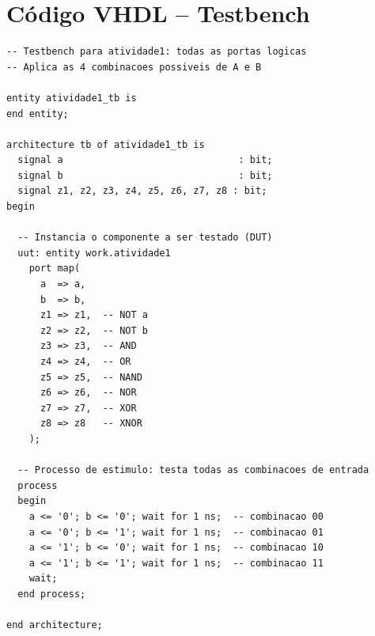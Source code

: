 \documentclass[12pt,a4paper, brazil]{article}
\begin{document}
\newpage

\section{Código VHDL -- Testbench}
\label{ap:testbench}

\begin{lstlisting}[style=vhdl, caption={Arquivo atividade1\_tb.vhd -- testbench para simulação.}]
-- Testbench para atividade1: todas as portas logicas
-- Aplica as 4 combinacoes possiveis de A e B

entity atividade1_tb is
end entity;

architecture tb of atividade1_tb is
  signal a                               : bit;
  signal b                               : bit;
  signal z1, z2, z3, z4, z5, z6, z7, z8 : bit;
begin

  -- Instancia o componente a ser testado (DUT)
  uut: entity work.atividade1
    port map(
      a  => a,
      b  => b,
      z1 => z1,  -- NOT a
      z2 => z2,  -- NOT b
      z3 => z3,  -- AND
      z4 => z4,  -- OR
      z5 => z5,  -- NAND
      z6 => z6,  -- NOR
      z7 => z7,  -- XOR
      z8 => z8   -- XNOR
    );

  -- Processo de estimulo: testa todas as combinacoes de entrada
  process
  begin
    a <= '0'; b <= '0'; wait for 1 ns;  -- combinacao 00
    a <= '0'; b <= '1'; wait for 1 ns;  -- combinacao 01
    a <= '1'; b <= '0'; wait for 1 ns;  -- combinacao 10
    a <= '1'; b <= '1'; wait for 1 ns;  -- combinacao 11
    wait;
  end process;

end architecture;
\end{lstlisting}
\end{document}
